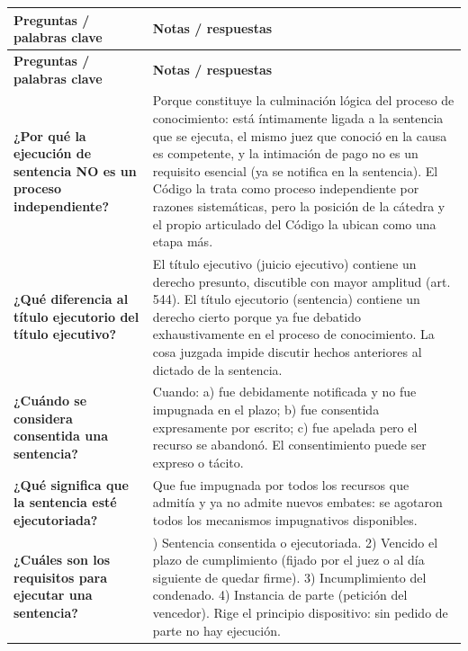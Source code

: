 \documentclass[12pt,oneside]{book}
\begin{document}
\begin{longtable}{
    >{\raggedright\arraybackslash}p{}
    >{\raggedright\arraybackslash}p{}
}
\toprule
\textbf{Preguntas / palabras clave} & \textbf{Notas / respuestas} \\
\midrule
\endfirsthead
\toprule
\textbf{Preguntas / palabras clave} & \textbf{Notas / respuestas} \\
\midrule
\endhead
\bottomrule
\endfoot
\bottomrule
\endlastfoot

\textbf{¿Por qu\'e la ejecuci\'on de sentencia NO es un proceso independiente?} &
Porque constituye la culminaci\'on l\'ogica del proceso de conocimiento: est\'a \'intimamente ligada a la sentencia que se ejecuta, el mismo juez que conoci\'o en la causa es competente, y la intimaci\'on de pago no es un requisito esencial (ya se notifica en la sentencia). El C\'odigo la trata como proceso independiente por razones sistem\'aticas, pero la posici\'on de la c\'atedra y el propio articulado del C\'odigo la ubican como una etapa m\'as. \\

\textbf{¿Qu\'e diferencia al t\'itulo ejecutorio del t\'itulo ejecutivo?} &
El t\'itulo ejecutivo (juicio ejecutivo) contiene un derecho presunto, discutible con mayor amplitud (art. 544). El t\'itulo ejecutorio (sentencia) contiene un derecho cierto porque ya fue debatido exhaustivamente en el proceso de conocimiento. La cosa juzgada impide discutir hechos anteriores al dictado de la sentencia. \\

\textbf{¿Cu\'ando se considera consentida una sentencia?} &
Cuando: a) fue debidamente notificada y no fue impugnada en el plazo; b) fue consentida expresamente por escrito; c) fue apelada pero el recurso se abandon\'o. El consentimiento puede ser expreso o t\'acito. \\

\textbf{¿Qu\'e significa que la sentencia est\'e ejecutoriada?} &
Que fue impugnada por todos los recursos que admit\'ia y ya no admite nuevos embates: se agotaron todos los mecanismos impugnativos disponibles. \\

\textbf{¿Cu\'ales son los requisitos para ejecutar una sentencia?} &
1) Sentencia consentida o ejecutoriada. 2) Vencido el plazo de cumplimiento (fijado por el juez o al d\'ia siguiente de quedar firme). 3) Incumplimiento del condenado. 4) Instancia de parte (petici\'on del vencedor). Rige el principio dispositivo: sin pedido de parte no hay ejecuci\'on. \\


\end{longtable}
\end{document}
